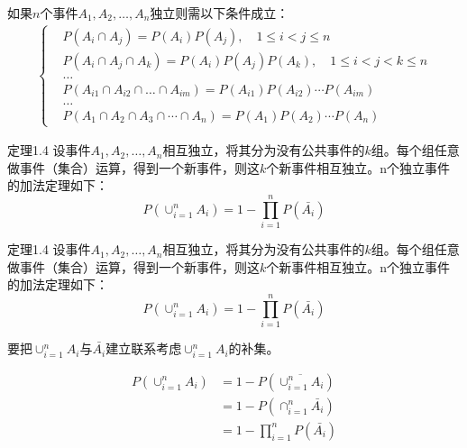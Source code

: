\documentclass{beamer}
\begin{document}
	\begin{frame}
		如果$n$个事件$A_1, A_2, \dots, A_n$独立则需以下条件成立：
		\begin{align}
			\begin{cases}
				& P(A_i \cap A_j) = P(A_i)P(A_j), \quad 1 \leq i < j \leq n \\
				& P(A_i \cap A_j \cap A_k ) =  P(A_i)P(A_j)P(A_k), \quad 1 \leq i < j < k \leq n\\
				& \dots \\
				& P(A_{i1} \cap A_{i2} \cap \dots \cap A_{im}) = P(A_{i1})P(A_{i2})\cdots P(A_{im}) \\
				& \dots \\
				& P(A_1 \cap A_2 \cap A_3 \cap \cdots \cap A_n) = P(A_1)P(A_2)\cdots P(A_n)
			\end{cases}\nonumber
		\end{align}
	\end{frame}
	
	\begin{frame}
		定理1.4 设事件$A_1, A_2, \dots, A_n$相互独立，将其分为没有公共事件的$k$组。每个组任意做事件（集合）运算，得到一个新事件，则这$k$个新事件相互独立。n个独立事件的加法定理如下：
		\[
		P(\cup_{i = 1}^{n}A_i) = 1 - \prod_{i = 1}^{n} P(\bar{A_i})
		\]
		
%		
	\end{frame}
	
	\begin{frame}
		定理1.4 设事件$A_1, A_2, \dots, A_n$相互独立，将其分为没有公共事件的$k$组。每个组任意做事件（集合）运算，得到一个新事件，则这$k$个新事件相互独立。n个独立事件的加法定理如下：
		\[
		P(\cup_{i = 1}^{n}A_i) = 1 - \prod_{i = 1}^{n} P(\bar{A_i})
		\]
		
		要把$\cup_{i = 1}^{n}A_i$与$\bar{A_i}$建立联系考虑$\cup_{i = 1}^{n}A_i$的补集。
		
		\begin{align}
			P(\cup_{i = 1}^{n}A_i) &= 1 - P(\overline{\cup_{i = 1}^{n}A_i}) \\
			& = 1 - P( \cap_{i = 1}^n \bar{A_i}) \\
			& = 1 - \prod_{i = 1}^{n}P(\bar{A_i})
		\end{align}
	\end{frame}
	
\end{document}

